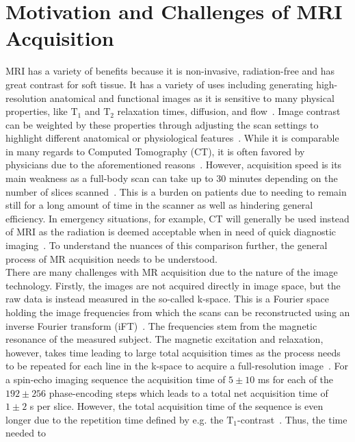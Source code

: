 \section{Motivation and Challenges of MRI Acquisition} \label{Sec:MotivationChallengesMRIAcquisition}
MRI has a variety of benefits because it is non-invasive, radiation-free and has great contrast for soft tissue. It has a variety of uses including generating high-resolution anatomical and functional images as it is sensitive to many physical properties, like $\text{T}_1$ and $\text{T}_2$ relaxation times, diffusion, and flow~\cite{AdvancesPI}. Image contrast can be weighted by these properties through adjusting the scan settings to highlight different anatomical or physiological features~\cite{AdvancesPI}. While it is comparable in many regards to Computed Tomography (CT), it is often favored by physicians due to the aforementioned reasons~\cite{Liu2013}. However, acquisition speed is its main weakness as a full-body scan can take up to 30 minutes depending on the number of slices scanned~\cite{Brown2014,PulseSequences}. This is a burden on patients due to needing to remain still for a long amount of time in the scanner as well as hindering general efficiency. In emergency situations, for example, CT will generally be used instead of MRI as the radiation is deemed acceptable when in need of quick diagnostic imaging~\cite{Liu2013}. To understand the nuances of this comparison further, the general process of MR acquisition needs to be understood.\\
There are many challenges with MR acquisition due to the nature of the image technology. Firstly, the images are not acquired directly in image space, but the raw data is instead measured in the so-called k-space. This is a Fourier space holding the image frequencies from which the scans can be reconstructed using an inverse Fourier transform (iFT)~\cite{Brown2014}. The frequencies stem from the magnetic resonance of the measured subject. The magnetic excitation and relaxation, however, takes time leading to large total acquisition times as the process needs to be repeated for each line in the k-space to acquire a full-resolution image~\cite{AdvancesPI}. For a spin-echo imaging sequence the acquisition time of $5 \pm 10$ ms for each of the $192 \pm 256$ phase-encoding steps which leads to a total net acquisition time of $1 \pm 2$ s per slice. However, the total acquisition time of the sequence is even longer due to the repetition time defined by e.g. the $\text{T}_1$-contrast~\cite{SamplingStrategies}. Thus, the time needed to
